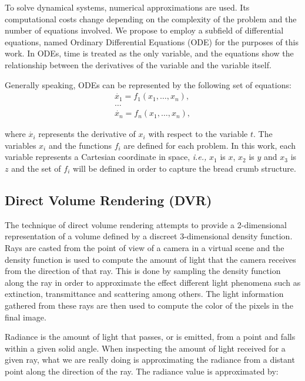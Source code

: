 \documentclass[oneside,a4paper,english,links]{amca}
\begin{document}
To solve dynamical systems, numerical approximations are used. Its computational costs change depending on the complexity of the problem and the number of equations involved. We propose to employ a subfield of differential equations, named Ordinary Differential Equations (ODE) for the purposes of this work. In ODEs, time is treated as the only variable, and the equations show the relationship between the derivatives of the variable and the variable itself. 

Generally speaking, ODEs can be represented by the following set of equations:
\begin{equation} \label{eq:simple}  
\begin{aligned}
\dot{x_{1}} = f_{1}(x_{1},\ldots,x_{n}),\\
\ldots\\
\dot{x_{n}} = f_{n}(x_{1},\ldots,x_{n}),
\end{aligned}
\end{equation}

where $\dot{x_{i}}$ represents the derivative of $x_{i}$ with respect to the variable $t$. The variables $x_{i}$ and the functions $f_{i}$ are defined for each problem. In this work, each variable represents a Cartesian coordinate in space, {\em i.e.,} $x_{1}$ is $x$, $x_{2}$ is $y$ and $x_{3}$ is $z$ and the set of $f_{i}$ will be defined in order to capture the bread crumb structure.


\subsection{Direct Volume Rendering (DVR)}

The technique of direct volume rendering attempts to provide a
2-dimensional representation of a volume defined by a discreet
3-dimensional density function. Rays are casted from the point of view
of a camera in a virtual scene and the density function is used to
compute the amount of light that the camera receives from the
direction of that ray. This is done by sampling the density function
along the ray in order to approximate the effect different light
phenomena such as extinction, transmittance and scattering among
others. The light information gathered from these rays are then used
to compute the color of the pixels in the final image.

Radiance is the amount of light that passes, or is emitted, from a
point and falls within a given solid angle. When inspecting the amount
of light received for a given ray, what we are really doing is
approximating the radiance from a distant point along the direction of
the ray. The radiance value is approximated by: 
\end{document}
